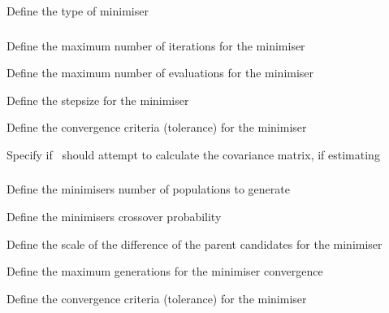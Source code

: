  {Define the type of minimiser}

\subsubsection[Numerical differences minimiser]{}

 {Define the maximum number of iterations for the minimiser}

 {Define the maximum number of evaluations for the minimiser}

 {Define the stepsize for the minimiser}

 {Define the convergence criteria (tolerance) for the minimiser}

 {Specify if \SPM\ should attempt to calculate the covariance matrix, if estimating}

\subsubsection[Differential evolution minimiser]{}

 {Define the minimisers number of populations to generate}

 {Define the minimisers crossover probability }

 {Define the scale of the difference of the parent candidates for the minimiser}

 {Define the maximum generations for the minimiser convergence}

 {Define the convergence criteria (tolerance) for the minimiser}

